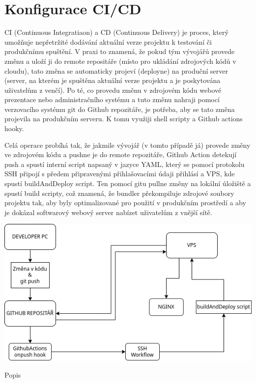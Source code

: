 \documentclass[12pt,a4paper]{report}
\begin{document}
  \section{Konfigurace CI/CD}
  CI (Continuous Integratiaon) a CD (Continuous Delivery) je proces, který umožňuje nepřetržité 
  dodávání aktuální verze projektu k testování či produkčnímu spuštění. V praxi to znamená,
  že pokud tým vývojářů provede změnu a uloží ji do remote repositáře
  (místo pro ukládání zdrojových kódů v cloudu), tato změna se automaticky projeví (deployne)
  na produční server (server, na kterém je spuštěna aktuální verze projektu a je poskytována
  uživatelům z venčí).
  Po té, co provedu změnu v zdrojovém kódu webové prezentace nebo administračního systému a 
  tuto změnu nahraji pomocí verzovacího systému git do Github repozitáře, je potřeba, aby se 
  tato změna projevila na produkčním serveru. K tomu využiji shell scripty a Github actions hooky.

  Celá operace probíhá tak, že jakmile vývojář (v tomto případě já) provede změny ve zdrojovém kódu
  a pushne je do remote repozitáře, Github Action detekují push a spustí interní script napsaný
  v jazyce YAML, který se pomocí protokolu SSH připojí s předem připravenými přihlašovacími
  údaji přihlásí a VPS, kde spustí buildAndDeploy script. Ten pomocí gitu pullne změny na lokální úložiště 
  a spustí build scripty, což znamená, že bundler překompiluje zdrojové soubory projektu tak, aby byly 
  optimalizované pro použití v produkčním prostředí a aby je dokázal softwarový webový server nabízet uživatelům z vnější sítě.
  
  \vspace*{0.5cm}
  \noindent\includegraphics[width=\linewidth]{CIDC_visualization.png}
  \begin{center}
    Popis
  \end{center}
  \vspace*{0.5cm}
\end{document}
